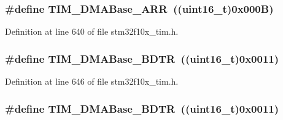 \subsubsection[{\texorpdfstring{T\+I\+M\+\_\+\+D\+M\+A\+Base\+\_\+\+A\+RR}{TIM_DMABase_ARR}}]{\setlength{\rightskip}{0pt plus 5cm}\#define T\+I\+M\+\_\+\+D\+M\+A\+Base\+\_\+\+A\+RR~(({\bf uint16\+\_\+t})0x000\+B)}\hypertarget{group___t_i_m___d_m_a___base__address_gaab8a66f70e59b5916b4bba344746d652}{}\label{group___t_i_m___d_m_a___base__address_gaab8a66f70e59b5916b4bba344746d652}


Definition at line 640 of file stm32f10x\+\_\+tim.\+h.

\subsubsection[{\texorpdfstring{T\+I\+M\+\_\+\+D\+M\+A\+Base\+\_\+\+B\+D\+TR}{TIM_DMABase_BDTR}}]{\setlength{\rightskip}{0pt plus 5cm}\#define T\+I\+M\+\_\+\+D\+M\+A\+Base\+\_\+\+B\+D\+TR~(({\bf uint16\+\_\+t})0x0011)}\hypertarget{group___t_i_m___d_m_a___base__address_gaaff22bbf3091c47783c1c68b648c8605}{}\label{group___t_i_m___d_m_a___base__address_gaaff22bbf3091c47783c1c68b648c8605}


Definition at line 646 of file stm32f10x\+\_\+tim.\+h.

\subsubsection[{\texorpdfstring{T\+I\+M\+\_\+\+D\+M\+A\+Base\+\_\+\+B\+D\+TR}{TIM_DMABase_BDTR}}]{\setlength{\rightskip}{0pt plus 5cm}\#define T\+I\+M\+\_\+\+D\+M\+A\+Base\+\_\+\+B\+D\+TR~(({\bf uint16\+\_\+t})0x0011)}\hypertarget{group___t_i_m___d_m_a___base__address_gaaff22bbf3091c47783c1c68b648c8605}{}\label{group___t_i_m___d_m_a___base__address_gaaff22bbf3091c47783c1c68b648c8605}


